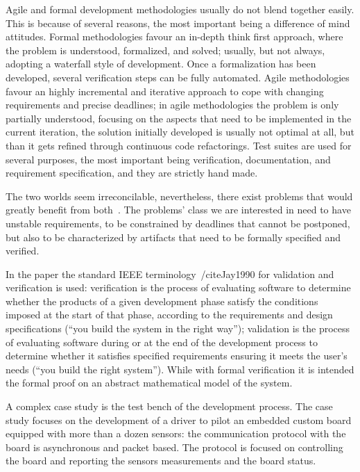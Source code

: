 \documentclass[english]{lni}
\begin{document}
Agile and formal development methodologies usually do not blend together easily.
This is because of several reasons, the most important being a difference of mind attitudes.
Formal methodologies favour an in-depth think first approach, where the problem is understood, formalized, and solved; usually, but not always, adopting a waterfall style of development.
Once a formalization has been developed, several verification steps can be fully automated.
Agile methodologies favour an highly incremental and iterative approach to cope with changing requirements and precise deadlines; in agile methodologies the problem is only partially understood, focusing on the aspects that need to be implemented in the current iteration, the solution initially developed is usually not optimal at all, but than it gets refined through continuous code refactorings.
Test suites are used for several purposes, the most important being verification, documentation, and requirement specification, and they are strictly hand made.

The two worlds seem irreconcilable, nevertheless, there exist problems that would greatly benefit from both~\cite{Black2009}.
The problems' class we are interested in need to have unstable requirements, to be constrained by deadlines that cannot be postponed, but also to be characterized by artifacts that need to be formally specified and verified.

In the paper the standard IEEE terminology~/cite{Jay1990} for validation and verification is used: verification is the process of evaluating software to determine whether the products of a given development phase satisfy the conditions imposed at the start of that phase, according to the requirements and design specifications (``you build the system in the right way''); validation is the process of evaluating software during or at the end of the development process to determine whether it satisfies specified requirements ensuring it meets the user's needs (``you build the right system'').
While with formal verification it is intended the formal proof on an abstract mathematical model of the system.

A complex case study is the test bench of the development process. 
The case study focuses on the development of a driver to pilot an embedded custom board equipped with more than a dozen sensors: the communication protocol with the board is asynchronous and packet based.
The protocol is focused on controlling the board and reporting the sensors measurements and the board status.
\end{document}
